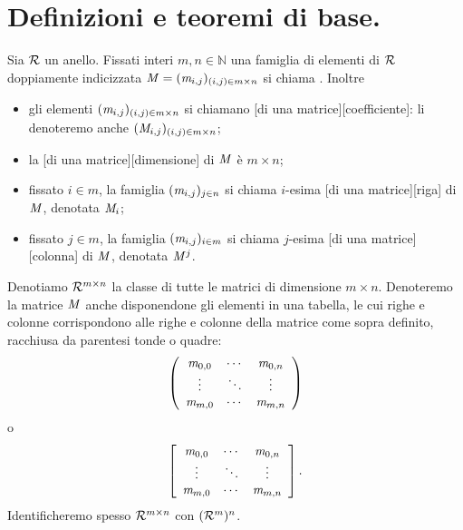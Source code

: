 \section{Definizioni e teoremi di base.}
\label{Matrici_DefinizioniETeoremiDiBase}
\begin{Definition}
	Sia $\mathcal{R}$ un anello. Fissati interi $m, n \in \mathbb{N}$ una
	famiglia di elementi di $\mathcal{R}$ doppiamente indicizzata
	$\mathit{M} = (\mathit{m}_{i,j})_{(i,j) \in m \times n}$ si chiama . Inoltre
	\begin{itemize}
		\item gli elementi $(\mathit{m}_{i,j})_{(i,j) \in m \times n}$ si chiamano
		[di una matrice][coefficiente]: li denoteremo anche $(\mathit{M}_{i,j})_{(i,j)\in m \times n}$;
		\item la [di una matrice][dimensione]
		di $\mathit{M}$ \`e $m \times n$;
		\item fissato $i \in m$, la famiglia
		$(\mathit{m}_{i,j})_{j \in n}$ si chiama $i$-esima
		[di una matrice][riga] di $\mathit{M}$, denotata $\mathit{M}_i$;
		\item fissato $j \in m$, la famiglia
		$(\mathit{m}_{i,j})_{i \in m}$ si chiama $j$-esima
		[di una matrice][colonna] di $\mathit{M}$, denotata $\mathit{M}^j$.
	\end{itemize}
	Denotiamo $\mathcal{R}^{m \times n}$ la classe di tutte le matrici di dimensione $m \times n$. Denoteremo la matrice $\mathit{M}$ anche disponendone gli elementi in una tabella, le cui righe e colonne corrispondono alle righe e colonne della matrice come sopra definito, racchiusa da parentesi tonde o quadre:
$$\left (
\begin{array}{ccc}
	\mathit{m}_{0,0}	&	\cdots	&	\mathit{m}_{0,n} \\
	\vdots	&	\ddots	&	\vdots \\
	\mathit{m}_{m,0}	&	\cdots	&	\mathit{m}_{m,n}
\end{array}
\right )$$
o
$$\left [
\begin{array}{ccc}
	\mathit{m}_{0,0}	&	\cdots	&	\mathit{m}_{0,n} \\
	\vdots	&	\ddots	&	\vdots \\
	\mathit{m}_{m,0}	&	\cdots	&	\mathit{m}_{m,n}
\end{array}
\right ].$$
	Identificheremo spesso $\mathcal{R}^{m \times n}$ con $(\mathcal{R}^m)^n$.
\end{Definition}
